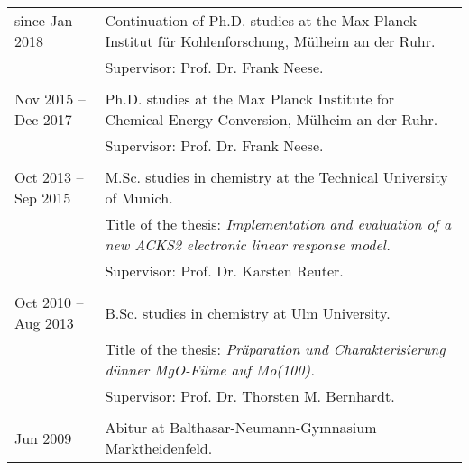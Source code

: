 \begin{tabular}{>{\raggedleft}p{}>{\raggedright\arraybackslash}p{}}
since Jan 2018 & Continuation of Ph.D. studies at the Max-Planck-Institut für Kohlenforschung, Mülheim an der Ruhr. \\
& Supervisor: Prof. Dr. Frank Neese. \\
& \\
Nov 2015 -- Dec 2017 & Ph.D. studies at the Max Planck Institute for Chemical Energy Conversion, Mülheim an der Ruhr. \\
& Supervisor: Prof. Dr. Frank Neese. \\
& \\
Oct 2013 -- Sep 2015 & M.Sc. studies in chemistry at the Technical University of Munich. \\
& Title of the thesis: \textit{Implementation and evaluation of a new ACKS2 electronic linear response model.}\\
& Supervisor: Prof. Dr. Karsten Reuter. \\
& \\
Oct 2010 -- Aug 2013 & B.Sc. studies in chemistry at Ulm University. \\
& Title of the thesis: \textit{Präparation und Charakterisierung dünner MgO-Filme auf Mo(100).} \\
& Supervisor: Prof. Dr. Thorsten M. Bernhardt. \\
& \\
Jun 2009 & Abitur at Balthasar-Neumann-Gymnasium Marktheidenfeld.
\end{tabular}

